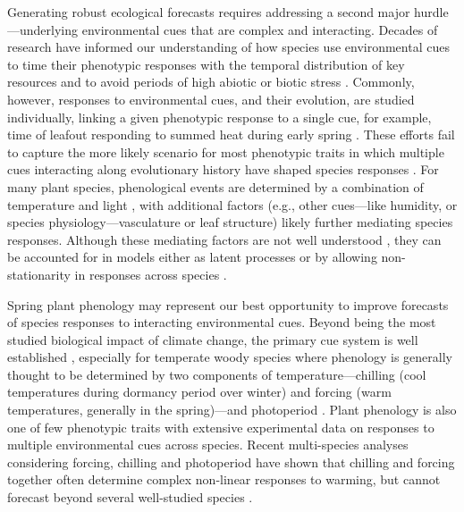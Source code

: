\documentclass[11pt]{article}
\begin{document}
Generating robust ecological forecasts requires addressing a second major hurdle---underlying environmental cues that are complex and interacting. Decades of research have informed our understanding of how species use environmental cues to time their phenotypic responses with the temporal distribution of key resources and to avoid periods of high abiotic or biotic stress \citep{larcher1980,bonamour2019}. Commonly, however, responses to environmental cues, and their evolution, are studied individually, linking a given phenotypic response to a single cue, for example, time of leafout responding to summed heat during early spring \citep{davies2013phylogenetic}. These efforts fail to capture the more likely scenario for most phenotypic traits in which multiple cues interacting along evolutionary history have shaped species responses \citep{Ackerly:2009ly}. For many plant species, phenological events are determined by a combination of temperature and light \citep{chuinearees}, with additional factors (e.g., other cues---like humidity, or species physiology---vasculature or leaf structure) likely further mediating species responses. Although these mediating factors are not well understood \citep{chuinearees}, they can be accounted for in models either as latent processes or by allowing non-stationarity in responses across species \citep{davies2019phylogenetically}.  

Spring plant phenology may represent our best opportunity to improve forecasts of species responses to interacting environmental cues. Beyond being the most studied biological impact of climate change, the primary cue system is well established \citep{chuinearees}, especially for temperate woody species where phenology is generally thought to be determined by two components of temperature---chilling (cool temperatures during dormancy period over winter) and forcing (warm temperatures, generally in the spring)---and photoperiod \citep{ospreephoto}. Plant phenology is also one of few phenotypic traits with extensive experimental data on responses to multiple environmental cues across species. Recent multi-species analyses considering forcing, chilling and photoperiod have shown that chilling and forcing together often determine complex non-linear responses to warming, but cannot forecast beyond several well-studied species \citep{ettinger2020}. %
\end{document}
